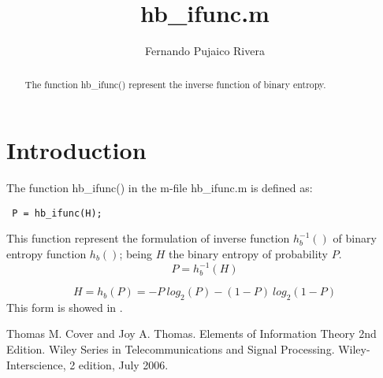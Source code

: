 \documentclass[a4paper,10pt]{article}
\title{hb\_ifunc.m}
\author{Fernando Pujaico Rivera}
\begin{document}
\maketitle
\begin{abstract}
The function hb\_ifunc() represent the inverse function of binary entropy.
\end{abstract}

\section{Introduction}
The function hb\_ifunc() in the m-file hb\_ifunc.m is defined as:
\lstset{language=octave}%
\begin{lstlisting}
 P = hb_ifunc(H);
\end{lstlisting}
This function represent the formulation of inverse function $h_b^{-1}()$ of binary entropy 
function $h_b()$; being  $H$ the binary entropy of probability $P$.
\begin{equation}\label{eq:hbinv}
 P=h_b^{-1}(H)
\end{equation}

\begin{equation}\label{eq:hb}
H=h_b(P)=-P~log_2(P) -(1-P)~log_2(1-P)
\end{equation}
This form is showed in \cite{thomas}.

 \begin{thebibliography}{99}
 
Thomas M. Cover and Joy A. Thomas. Elements of Information Theory 2nd Edition. 
Wiley Series in Telecommunications and Signal Processing. 
Wiley-Interscience, 2 edition, July 2006.



 \end{thebibliography} 
\end{document}
